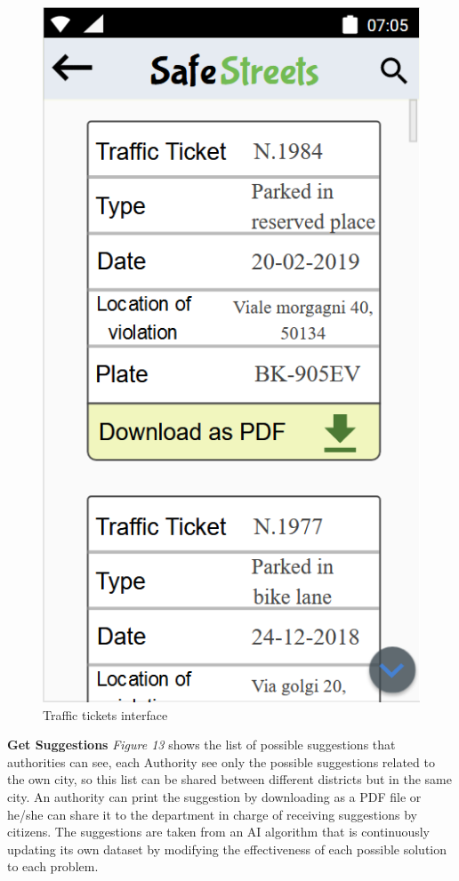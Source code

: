        \begin{figure}[h]
        \centering
        \includegraphics[scale=0.85]{Images/traffic_ticket.png}
        \caption{Traffic tickets interface}
    \end{figure}\newline
    \textbf{Get Suggestions}\newline
    \textit{Figure 13} shows the list of possible suggestions that authorities can see, each Authority see only the possible suggestions related to the own city, so this list can be shared between different districts but in the same city. An authority can print the suggestion by downloading as a PDF file or he/she can share it to the department in charge of receiving suggestions by citizens. The suggestions are taken from an AI algorithm  that is continuously updating its own dataset by modifying the effectiveness of each possible solution to each problem.  
    
